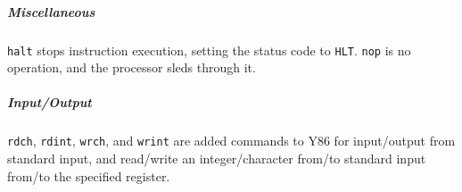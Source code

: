 \documentclass[11pt]{article}
\begin{document}
	\subparagraph{Miscellaneous} \verb|halt| stops instruction execution, setting the status code to \verb|HLT|. \verb|nop| is no operation, and the processor sleds through it.
	
	\subparagraph{Input/Output} \verb|rdch|, \verb|rdint|, \verb|wrch|, and \verb|wrint| are added commands to Y86 for input/output from standard input, and read/write an integer/character from/to standard input from/to the specified register.
	

%		
%		


\end{document}
